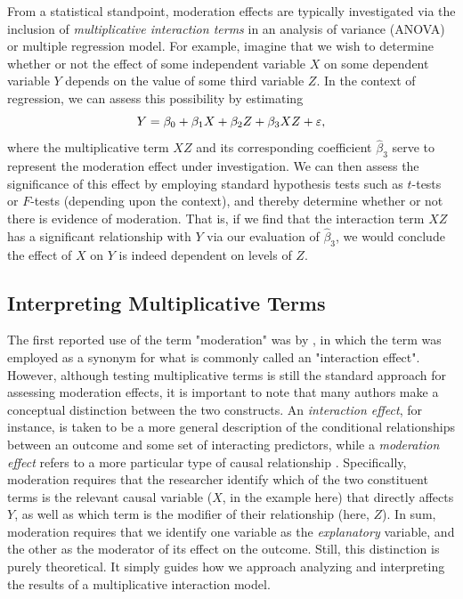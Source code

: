 From a statistical standpoint, moderation effects are typically investigated via the inclusion of \textit{multiplicative interaction terms} in an analysis of variance (ANOVA) or multiple regression model. For example, imagine that we wish to determine whether or not the effect of some independent variable $X$ on some dependent variable $Y$ depends on the value of some third variable $Z$. In the context of regression, we can assess this possibility by estimating
\begin{equation} \label{mod}
    Y = \beta_0 + \beta_1 X + \beta_2 Z + \beta_3 XZ + \varepsilon,
\end{equation}
where the multiplicative term $XZ$ and its corresponding coefficient $\hat{\beta}_3$ serve to represent the moderation effect under investigation. We can then assess the significance of this effect by employing standard hypothesis tests such as $t$-tests or $F$-tests (depending upon the context), and thereby determine whether or not there is evidence of moderation. That is, if we find that the interaction term $XZ$ has a significant relationship with $Y$ via our evaluation of $\hat{\beta}_3$, we would conclude the effect of $X$ on $Y$ is indeed dependent on levels of $Z$.

\subsection{Interpreting Multiplicative Terms}
The first reported use of the term "moderation" was by \cite{saunders1955moderator}, in which the term was employed as a synonym for what is commonly called an "interaction effect". However, although testing multiplicative terms is still the standard approach for assessing moderation effects, it is important to note that many authors make a conceptual distinction between the two constructs. An \textit{interaction effect}, for instance, is taken to be a more general description of the conditional relationships between an outcome and some set of interacting predictors, while a \textit{moderation effect} refers to a more particular type of causal relationship \cite{hall2013mediation}. Specifically, moderation requires that the researcher identify which of the two constituent terms is the relevant causal variable ($X$, in the example here) that directly affects $Y$, as well as which term is the modifier of their relationship (here, $Z$). In sum, moderation requires that we identify one variable as the \textit{explanatory} variable, and the other as the moderator of its effect on the outcome. Still, this distinction is purely theoretical. It simply guides how we approach analyzing and interpreting the results of a multiplicative interaction model. 

